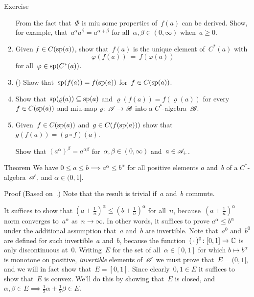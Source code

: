 \documentclass[a]{subfiles}
\begin{document}
\begin{parsec}
\begin{point}{Exercise}
\begin{enumerate}
From the fact that~$\Phi$ is miu some properties
of~$f(a)$ can be derived.
Show, for example,
that~$a^\alpha a^\beta = a^{\alpha+\beta}$
for all~$\alpha,\beta\in(0,\infty)$
when~$a\geq 0$.
\item
Given $f\in C(\mathrm{sp}(a))$,
show that~$f(a)$ is the unique element of~$C^*(a)$
with 
\begin{equation*}
	\varphi(f(a))
	 \ =\ f(\varphi(a))
\end{equation*}
for all~$\varphi\in\mathrm{sp}(C^*(a))$.
\item
()%
Show that~$\mathrm{sp}(f(a))=f(\mathrm{sp}(a))$
for~$f\in C(\mathrm{sp}(a))$.
\item
Show that~$\mathrm{sp}(\varrho(a))\subseteq
\mathrm{sp}(a)$
and $\varrho(f(a))=f(\varrho(a))$
for every $f\in C(\mathrm{sp}(a))$ and  miu-map
$\varrho\colon \mathscr{A}\to\mathscr{B}$
into a $C^*$-algebra~$\mathscr{B}$.
\item
Given~$f\in C(\mathrm{sp}(a))$ and~$g\in C(f(\mathrm{sp}(a)))$
show that $g(f(a))=(g\circ f)(a)$.

Show that $(a^\alpha)^\beta = a^{\alpha\beta}$
for~$\alpha,\beta\in (0,\infty)$
and~$a\in\mathscr{A}_+$.
\end{enumerate}
\end{point}
\begin{point}{Theorem}%
We have $0\leq a\leq b \implies a^\alpha \leq b^\alpha$
for all positive elements $a$ and~$b$
of a $C^*$-algebra~$\mathscr{A}$,
and $\alpha\in (0,1]$.
\begin{point}{Proof}%
(Based on~\cite{pedersen1972}.)
Note that the result is trivial if~$a$ and~$b$ commute.

It suffices to show that
$(a+\frac{1}{n})^\alpha \leq (b+\frac{1}{n})^\alpha$
for all~$n$,
because~$(a+\frac{1}{n})^\alpha$
norm converges to~$a^\alpha$
as~$n\to\infty$.
In other words,
it suffices to prove $a^\alpha \leq b^\alpha$
under the additional assumption that~$a$ and~$b$ are invertible.
Note that~$a^0$ and~$b^0$ are defined for such
invertible~$a$ and~$b$,
because the
function~$(\,\cdot\,)^0\colon [0,1]\to\mathbb{C}$
is only discontinuous at~$0$.
Writing~$E$ for the set of all~$\alpha\in[0,1]$
for which $b\mapsto b^\alpha$ is monotone
on positive,
\emph{invertible} elements of~$\mathscr{A}$
we must prove that~$E=(0,1]$,
and we will in fact show that~$E=[0,1]$.
Since clearly~$0,1\in E$
it suffices to show that~$E$ is convex.
We'll do this by showing that~$E$
is closed,
and $\alpha,\beta\in E\implies \frac{1}{2}\alpha 
+ \frac{1}{2}\beta \in E$.


\end{point}
\end{point}
\end{parsec}
\end{document}

